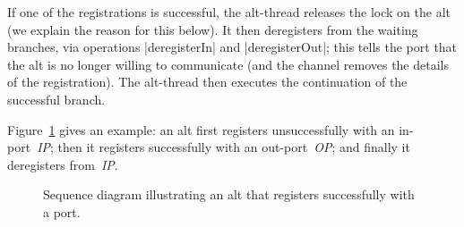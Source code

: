 If one of the registrations is successful, the alt-thread releases the lock on
the alt (we explain the reason for this below).  It then deregisters from the
waiting branches, via operations |deregisterIn| and |deregisterOut|; this
tells the port that the alt is no longer willing to communicate (and the
channel removes the details of the registration).  The alt-thread then
executes the continuation of the successful branch.

\def\IP{\emph{IP}}
\def\OP{\emph{OP}}

Figure~\ref{fig:alt-1} gives an example: an alt first registers unsuccessfully
with an in-port~\IP; then it registers successfully with an out-port~\OP; and
finally it deregisters from~\IP.


\begin{figure}
\begin{center}
\def\height{7.5} %
\def\gap{3.5} %
\end{center}
\caption{Sequence diagram illustrating an alt that registers successfully with
  a port. \label{fig:alt-1}}
\end{figure}


